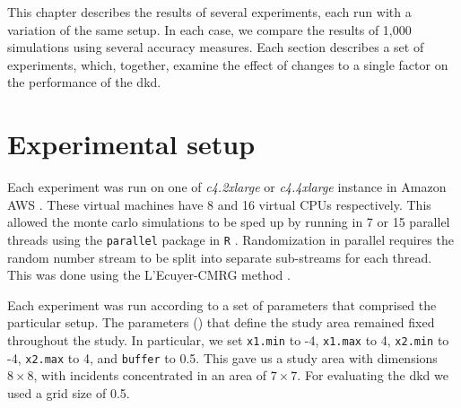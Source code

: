 

\newcommand{\scatterplotcaption}[0]{Small dots are population; triangles are incidents.}%
\newcommand{\errorplotcaption}[0]{%
Triangles and solid lines are using the \glsentryname{oracle} bandwidth.%
Circles and dot-dash lines are \glsentryname{cv} bandwidth.%
Squares and dashed lines are \glsentryname{silverman} bandwidth.%
}%


This chapter describes the results of several experiments, each run with a variation of the same setup.
In each case, we compare the results of 1,000 simulations using several accuracy measures.
Each section describes a set of experiments, which, together, examine the effect of changes to a single factor on the performance of the \gls{dkd}.

\section{Experimental setup}
\label{sec:results:setup}

Each experiment was run on one of \textit{c4.2xlarge} or \textit{c4.4xlarge} instance in Amazon AWS \citep{aws:instancetypes}.
These virtual machines have 8 and 16 virtual CPUs respectively.
This allowed the monte carlo simulations to be sped up by running in 7 or 15 parallel threads using the \texttt{parallel} package in \texttt{R} \citep{r:parallel}.
Randomization in parallel requires the random number stream to be split into separate sub-streams for each thread. 
This was done using the L'Ecuyer-CMRG method \citep{lecuyer2002random}.

Each experiment was run according to a set of parameters that comprised the particular setup.
The parameters () that define the study area remained fixed throughout the study.
In particular, we set \texttt{x1.min} to -4, \texttt{x1.max} to 4, \texttt{x2.min} to -4, \texttt{x2.max} to 4, and \texttt{buffer} to 0.5.
This gave us a study area with dimensions $8 \times 8$, with incidents concentrated in an area of $7 \times 7$.
For evaluating the \gls{dkd} we used a grid size of 0.5.

